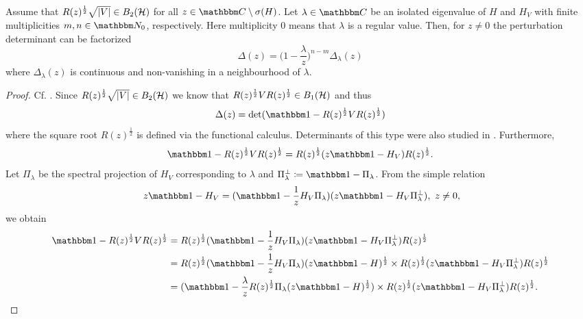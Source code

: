 \begin{lemma}\label{energy00at}
Assume that $R(z)^{\frac{1}{2}}\sqrt{|V|}\in B_2({\mathcal H})$ for all $z\in\C\setminus\sigma(H)$.
Let $\lambda\in\C$ be an isolated eigenvalue of $H$ and $H_V$  with finite multiplicities $m,n\in\N_0$, respectively.
Here multiplicity $0$ means that $\lambda$ is a regular value.
Then, for $z\neq 0$ the perturbation determinant can be factorized
\begin{equation*}
  \Delta(z) = \Big(1-\frac{\lambda}{z}\Big)^{n-m} \Delta_\lambda(z)
\end{equation*}
where $\Delta_\lambda(z)$ is continuous and non-vanishing in a neighbourhood of $\lambda$.
\end{lemma}
\begin{proof}
Cf. \cite[IV.3.4]{GohbergKrein1969}. 
Since $R(z)^{\frac{1}{2}}\sqrt{|V|}\in B_2({\mathcal H})$ we know that $R(z)^{\frac{1}{2}}VR(z)^{\frac{1}{2}}\in B_1({\mathcal H})$ and thus
\begin{equation*}
  \Delta(z) = \det( \id -R(z)^{\frac{1}{2}}VR(z)^{\frac{1}{2}} )
\end{equation*}
where the square root $R(z)^{\frac{1}{2}}$ is defined via the functional calculus.
Determinants of this type were also studied in \cite{GesztesyZinchenko2012}.
Furthermore,
\begin{equation*}
  \id -R(z)^{\frac{1}{2}}VR(z)^{\frac{1}{2}}  = R(z)^{\frac{1}{2}}(z\id - H_V)R(z)^{\frac{1}{2}} .
\end{equation*}
Let $\Pi_\lambda$ be the spectral projection of $H_V$ corresponding to $\lambda$ and $\Pi_\lambda^\perp\coloneqq\id-\Pi_\lambda$. 
From the simple relation
\begin{equation*}\
  z\id-H_V =  (\id- \frac{1}{z}H_V\Pi_\lambda)(z\id-H_V\Pi_\lambda^\perp),\ z\neq 0,
\end{equation*}
we obtain
\begin{equation*}
\begin{split}
  \id -R(z)^{\frac{1}{2}}VR(z)^{\frac{1}{2}}
     & = R(z)^{\frac{1}{2}}(\id-\frac{1}{z}H_V\Pi_\lambda)(z\id-H_V\Pi_\lambda^\perp)R(z)^{\frac{1}{2}}\\
     & = R(z)^{\frac{1}{2}}(\id-\frac{1}{z}H_V\Pi_\lambda)(z\id-H)^{\frac{1}{2}}\times
            R(z)^{\frac{1}{2}}(z\id-H_V\Pi_\lambda^\perp)R(z)^{\frac{1}{2}}\\
     & = ( \id - \frac{\lambda}{z}R(z)^{\frac{1}{2}}\Pi_\lambda(z\id-H)^{\frac{1}{2}} )\times
            R(z)^{\frac{1}{2}}(z\id-H_V\Pi_\lambda^\perp)R(z)^{\frac{1}{2}} .
\end{split}

\end{equation*}
\end{proof}
